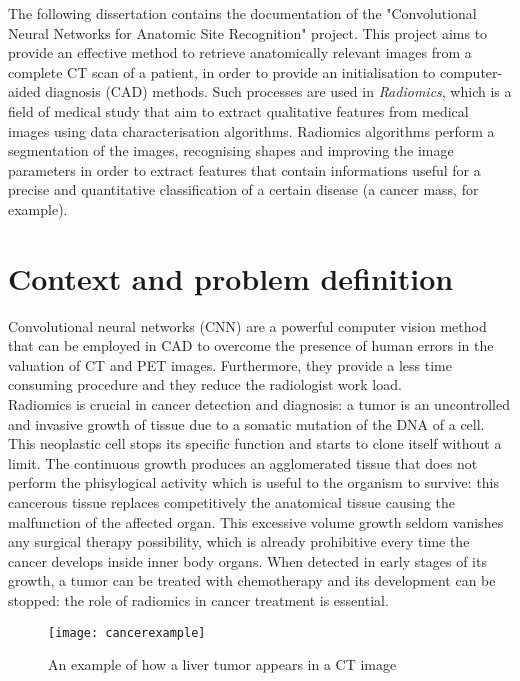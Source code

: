 \documentclass[../main.tex]{subfiles}
\begin{document}
\thispagestyle{empty}
The following dissertation contains the documentation of the "Convolutional Neural Networks for Anatomic Site Recognition" project. 
This project aims to provide an effective method to retrieve anatomically relevant images from a complete CT scan of a patient, in order to provide an initialisation to computer-aided diagnosis (CAD) methods.
Such processes are used in \textit{Radiomics}, which is a field of medical study that aim to extract qualitative features from medical images using data characterisation algorithms.
Radiomics algorithms perform a segmentation of the images, recognising shapes and improving the image parameters in order to extract features that contain informations useful for a precise and quantitative classification of a certain disease (a cancer mass, for example).

\section{Context and problem definition}
Convolutional neural networks (CNN) are  a powerful computer vision method that can be employed in CAD to overcome the presence of human errors in the valuation of CT and PET images. Furthermore, they provide a less time consuming procedure and they reduce the radiologist work load. \\
Radiomics is crucial in cancer detection and diagnosis: a tumor is an uncontrolled and invasive growth of tissue due to a somatic mutation of the DNA of a cell. This neoplastic cell stops its specific function and starts to clone itself without a limit. The continuous growth produces an agglomerated tissue that does not perform the phisylogical activity which is useful to the organism to survive: this cancerous tissue replaces competitively the anatomical tissue causing the malfunction of the affected organ. This excessive volume growth seldom vanishes any surgical therapy possibility, which is already prohibitive every time the cancer develops inside inner body organs. 
When detected in early stages of its growth, a tumor can be treated with chemotherapy and its development can be stopped: the role of radiomics in cancer treatment is essential.

\begin{figure}[!b] 
\centering 
\texttt{[image: cancerexample]}
\caption{An example of how a liver tumor appears in a CT image} 
\label{cancerexample} 
\vspace{5mm}
\end{figure}
\end{document}
